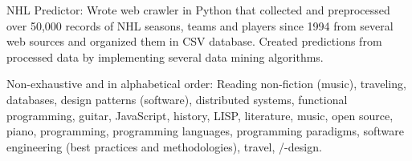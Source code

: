 \documentclass[10pt,a4paper]{article}
\begin{document}
\vspace{0.5em}
\inlineheadsection
  {NHL Predictor:}
  {Wrote web crawler in Python that collected and preprocessed over
50,000 records of NHL seasons, teams and players since 1994 from several web sources and organized them
in CSV database. Created predictions from processed data by implementing several data mining algorithms.}

\spacedhrule{1.6em}{-0.4em}


\inlineheadsection
  {Non-exhaustive and in alphabetical order:}
  {Reading non-fiction (music), traveling,  databases, design patterns (software), distributed systems,
functional programming, guitar, JavaScript, history, LISP, literature, music, open
source, piano, programming, programming languages, programming paradigms, software
engineering (best practices and methodologies), travel, /-design.}
\end{document}
